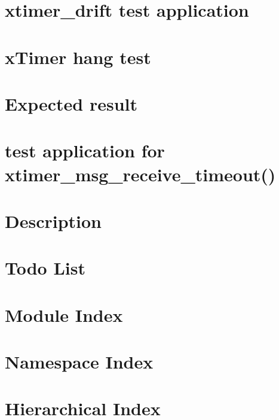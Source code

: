 \documentclass[twoside]{book}
\newcommand{\+}{\discretionary{\mbox{\scriptsize$\hookleftarrow$}}{}{}}
\begin{document}
\chapter{xtimer\+\_\+drift test application}
\label{md__home_ayush_RIOT_tests_xtimer_drift_README}

\chapter{x\+Timer hang test}
\label{md__home_ayush_RIOT_tests_xtimer_hang_README}

\chapter{Expected result}
\label{md__home_ayush_RIOT_tests_xtimer_longterm_README}

\chapter{test application for xtimer\+\_\+msg\+\_\+receive\+\_\+timeout()}
\label{md__home_ayush_RIOT_tests_xtimer_msg_receive_timeout_README}

\chapter{Description}
\label{md__home_ayush_RIOT_tests_xtimer_now64_continuity_README}

\chapter{Todo List}
\label{todo}

\chapter{Module Index}

\chapter{Namespace Index}

\chapter{Hierarchical Index}

\end{document}
